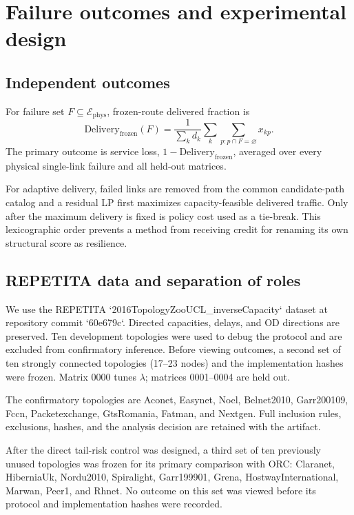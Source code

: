 \documentclass[preprint,12pt]{elsarticle}
\newcommand{\Ephys}{\mathcal{E}_{\mathrm{phys}}}
\begin{document}
\section{Failure outcomes and experimental design}

\subsection{Independent outcomes}

For failure set $F\subseteq\Ephys$, frozen-route delivered fraction is
\begin{equation}
 \mathrm{Delivery}_{\mathrm{frozen}}(F)=
 \frac{1}{\sum_kd_k}
 \sum_k\sum_{p:p\cap F=\varnothing}x_{kp}.
 \label{eq:frozen}
\end{equation}
The primary outcome is service loss,
$1-\mathrm{Delivery}_{\mathrm{frozen}}$, averaged over every physical
single-link failure and all held-out matrices.

For adaptive delivery, failed links are removed from the common candidate-path
catalog and a residual LP first maximizes capacity-feasible delivered traffic.
Only after the maximum delivery is fixed is policy cost used as a tie-break.
This lexicographic order prevents a method from receiving credit for renaming
its own structural score as resilience.

\subsection{REPETITA data and separation of roles}

We use the REPETITA `2016TopologyZooUCL\_inverseCapacity` dataset at repository
commit `60e679c`. Directed capacities, delays, and OD directions are preserved.
Ten development topologies were used to debug the protocol and are excluded
from confirmatory inference. Before viewing outcomes, a second set of ten
strongly connected topologies (17--23 nodes) and the implementation hashes were
frozen. Matrix 0000 tunes $\lambda$; matrices 0001--0004 are held out.

The confirmatory topologies are Aconet, Easynet, Noel, Belnet2010, Garr200109,
Fccn, Packetexchange, GtsRomania, Fatman, and Nextgen. Full inclusion rules,
exclusions, hashes, and the analysis decision are retained with the artifact.

After the direct tail-risk control was designed, a third set of ten previously
unused topologies was frozen for its primary comparison with ORC: Claranet,
HiberniaUk, Nordu2010, Spiralight, Garr199901, Grena, HostwayInternational,
Marwan, Peer1, and Rhnet. No outcome on this set was viewed before its protocol
and implementation hashes were recorded.
\end{document}
